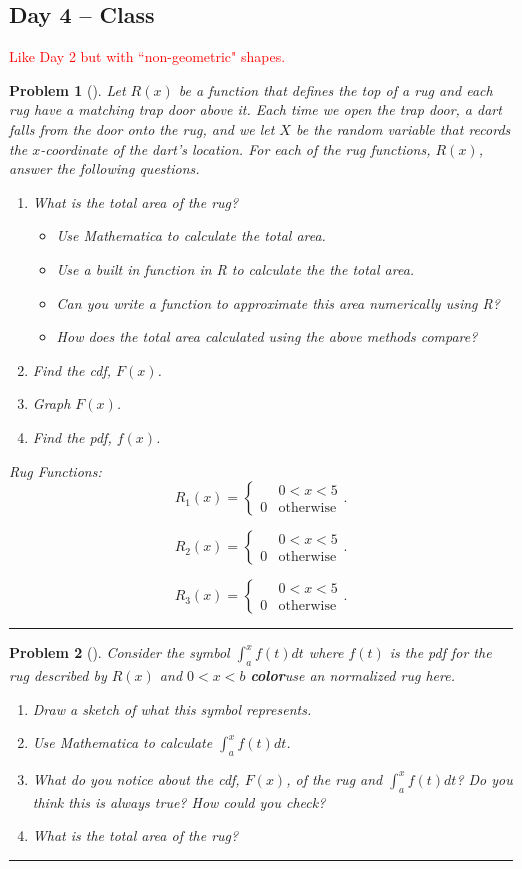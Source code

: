 \documentclass[letterpaper,oneside]{book}%
\theoremstyle{plain}
\theoremstyle{box}
\theoremstyle{problem}
\newtheorem{problemnum}{Problem}[chapter]
\newenvironment{problem}[1][]{\begin{problemnum}[#1]}{\end{problemnum}\nopagebreak\hrule\bigskip}
\begin{document}
\subsection{Day 4 -- Class}
\textcolor{red}{Like Day 2 but with ``non-geometric" shapes.}
\begin{problem}
\label{D4_InconvientRugs}
Let $R(x)$ be a function that defines the top of a rug and each rug have a matching trap door above it. Each time we open the trap door, a dart falls from the door onto the rug, and we let $X$ be the random variable that records the $x$-coordinate of the dart's location. For each of the rug functions, $R(x)$, answer the following questions.
\begin{enumerate}
\item What is the total area of the rug?
 \begin{itemize}
 \item Use Mathematica to calculate the total area.
 \item Use a built in function in R to calculate the the total area.
 \item Can you write a function to approximate this area numerically using R?
 \item How does the total area calculated using the above methods compare?
 \end{itemize}
\item Find the cdf, $F(x)$.
\item Graph $F(x)$.
\item Find the pdf, $f(x)$.
\end{enumerate}

Rug Functions:
$$R_1(x) = 
    \begin{cases}
     & 0 < x < 5 \\
    0 & \text{otherwise}
    \end{cases}.$$

$$R_2(x) = 
    \begin{cases}
     & 0 < x < 5 \\
    0 & \text{otherwise}
    \end{cases}.$$
    
$$R_3(x) = 
    \begin{cases}
     & 0 < x < 5 \\
    0 & \text{otherwise}
    \end{cases}.$$
\end{problem}

\begin{problem}
Consider the symbol $\int_a^x f(t)dt$ where $f(t)$ is the pdf for the rug described by $R(x)$ and $0 < x < b$ \textbf{color}{use an normalized rug here}.
\begin{enumerate}
\item Draw a sketch of what this symbol represents.
\item Use Mathematica to calculate $\int_a^x f(t)dt$.
\item What do you notice about the cdf, $F(x)$, of the rug and $\int_a^x f(t)dt$? Do you think this is always true? How could you check?
\item What is the total area of the rug?
\end{enumerate}
\end{problem}
\end{document}
